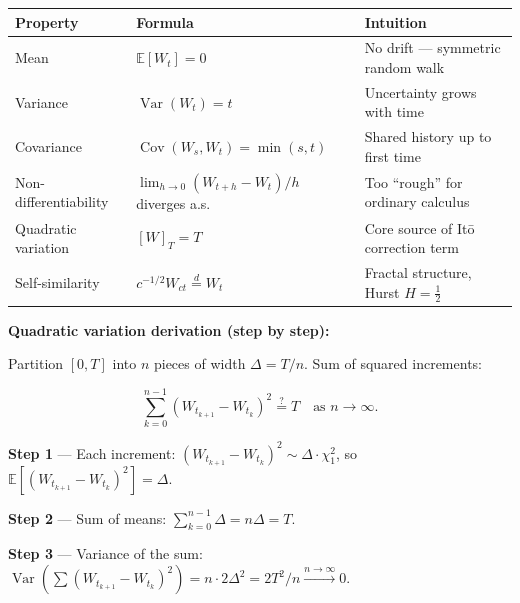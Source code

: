\documentclass[11pt,a4paper]{article}
\begin{document}
{\def\LTcaptype{none} %
\begin{longtable}[]{@{}
  >{\raggedright\arraybackslash}p{}
  >{\raggedright\arraybackslash}p{}
  >{\raggedright\arraybackslash}p{}@{}}
\toprule\noalign{}
\begin{minipage}[b]{\linewidth}\raggedright
Property
\end{minipage} & \begin{minipage}[b]{\linewidth}\raggedright
Formula
\end{minipage} & \begin{minipage}[b]{\linewidth}\raggedright
Intuition
\end{minipage} \\
\midrule\noalign{}
\endhead
\bottomrule\noalign{}
\endlastfoot
Mean & \(\mathbb{E}[W_t] = 0\) & No drift --- symmetric random walk \\
Variance & \(\operatorname{Var}(W_t) = t\) & Uncertainty grows with time \\
Covariance & \(\operatorname{Cov}(W_s,W_t) = \min(s,t)\) & Shared history up to first time \\
Non-differentiability & \(\lim_{h\to 0}(W_{t+h}-W_t)/h\) diverges a.s. & Too ``rough'' for ordinary calculus \\
Quadratic variation & \([W]_T = T\) & Core source of Itō correction term \\
Self-similarity & \(c^{-1/2}W_{ct} \overset{d}{=} W_t\) & Fractal structure, Hurst \(H=\tfrac12\) \\
\end{longtable}
}

\textbf{Quadratic variation derivation (step by step):}

Partition \([0,T]\) into \(n\) pieces of width \(\Delta = T/n\). Sum of squared increments:

\[\sum_{k=0}^{n-1}(W_{t_{k+1}}-W_{t_k})^2 \overset{?}{=} T \quad \text{as } n\to\infty.\]

\textbf{Step 1} --- Each increment: \((W_{t_{k+1}}-W_{t_k})^2 \sim \Delta \cdot \chi_1^2\), so \(\mathbb{E}[(W_{t_{k+1}}-W_{t_k})^2] = \Delta\).

\textbf{Step 2} --- Sum of means: \(\sum_{k=0}^{n-1} \Delta = n\Delta = T\).

\textbf{Step 3} --- Variance of the sum: \(\operatorname{Var}\!\left(\sum (W_{t_{k+1}}-W_{t_k})^2\right) = n \cdot 2\Delta^2 = 2T^2/n \xrightarrow{n\to\infty} 0\).
\end{document}
